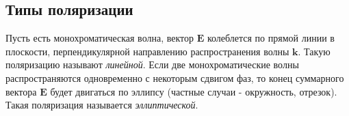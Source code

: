 \subsection*{Типы поляризации}
%
%
%
Пусть есть монохроматическая волна, вектор $\bm{E}$ колеблется по прямой линии в плоскости, перпендикулярной направлению распространения волны $\bm{k}$. Такую поляризацию называют \textit{линейной}.
\n\n
Если две монохроматические волны распространяются одновременно с некоторым сдвигом фаз, то конец суммарного вектора $\bm{E}$ будет двигаться по эллипсу (частные случаи - окружность, отрезок). Такая поляризация называется \textit{эллиптической}.
